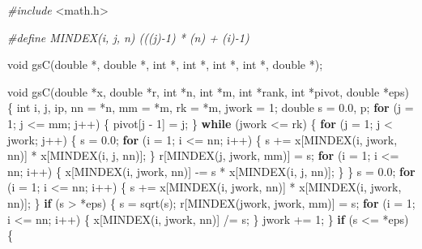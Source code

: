 \documentclass[
  12pt,
]{book}
\newenvironment{Shaded}{\begin{snugshade}}{\end{snugshade}}
\newcommand{\ControlFlowTok}[1]{\textcolor[rgb]{0.13,0.29,0.53}{\textbf{#1}}}
\newcommand{\DataTypeTok}[1]{\textcolor[rgb]{0.13,0.29,0.53}{#1}}
\newcommand{\DecValTok}[1]{\textcolor[rgb]{0.00,0.00,0.81}{#1}}
\newcommand{\FloatTok}[1]{\textcolor[rgb]{0.00,0.00,0.81}{#1}}
\newcommand{\ImportTok}[1]{#1}
\newcommand{\NormalTok}[1]{#1}
\newcommand{\PreprocessorTok}[1]{\textcolor[rgb]{0.56,0.35,0.01}{\textit{#1}}}
\begin{document}
\begin{Shaded}
\begin{Highlighting}[]
\PreprocessorTok{\#include }\ImportTok{\textless{}math.h\textgreater{}}

\PreprocessorTok{\#define MINDEX(i, j, n) (((j){-}1) * (n) + (i){-}1)}

\DataTypeTok{void}\NormalTok{ gsC(}\DataTypeTok{double}\NormalTok{ *, }\DataTypeTok{double}\NormalTok{ *, }\DataTypeTok{int}\NormalTok{ *, }\DataTypeTok{int}\NormalTok{ *, }\DataTypeTok{int}\NormalTok{ *, }\DataTypeTok{int}\NormalTok{ *, }\DataTypeTok{double}\NormalTok{ *);}

\DataTypeTok{void}\NormalTok{ gsC(}\DataTypeTok{double}\NormalTok{ *x, }\DataTypeTok{double}\NormalTok{ *r, }\DataTypeTok{int}\NormalTok{ *n, }\DataTypeTok{int}\NormalTok{ *m, }\DataTypeTok{int}\NormalTok{ *rank, }\DataTypeTok{int}\NormalTok{ *pivot,}
         \DataTypeTok{double}\NormalTok{ *eps) \{}
  \DataTypeTok{int}\NormalTok{ i, j, ip, nn = *n, mm = *m, rk = *m, jwork = }\DecValTok{1}\NormalTok{;}
  \DataTypeTok{double}\NormalTok{ s = }\FloatTok{0.0}\NormalTok{, p;}
  \ControlFlowTok{for}\NormalTok{ (j = }\DecValTok{1}\NormalTok{; j \textless{}= mm; j++) \{}
\NormalTok{    pivot[j {-} }\DecValTok{1}\NormalTok{] = j;}
\NormalTok{  \}}
  \ControlFlowTok{while}\NormalTok{ (jwork \textless{}= rk) \{}
    \ControlFlowTok{for}\NormalTok{ (j = }\DecValTok{1}\NormalTok{; j \textless{} jwork; j++) \{}
\NormalTok{      s = }\FloatTok{0.0}\NormalTok{;}
      \ControlFlowTok{for}\NormalTok{ (i = }\DecValTok{1}\NormalTok{; i \textless{}= nn; i++) \{}
\NormalTok{        s += x[MINDEX(i, jwork, nn)] * x[MINDEX(i, j, nn)];}
\NormalTok{      \}}
\NormalTok{      r[MINDEX(j, jwork, mm)] = s;}
      \ControlFlowTok{for}\NormalTok{ (i = }\DecValTok{1}\NormalTok{; i \textless{}= nn; i++) \{}
\NormalTok{        x[MINDEX(i, jwork, nn)] {-}= s * x[MINDEX(i, j, nn)];}
\NormalTok{      \}}
\NormalTok{    \}}
\NormalTok{    s = }\FloatTok{0.0}\NormalTok{;}
    \ControlFlowTok{for}\NormalTok{ (i = }\DecValTok{1}\NormalTok{; i \textless{}= nn; i++) \{}
\NormalTok{      s += x[MINDEX(i, jwork, nn)] * x[MINDEX(i, jwork, nn)];}
\NormalTok{    \}}
    \ControlFlowTok{if}\NormalTok{ (s \textgreater{} *eps) \{}
\NormalTok{      s = sqrt(s);}
\NormalTok{      r[MINDEX(jwork, jwork, mm)] = s;}
      \ControlFlowTok{for}\NormalTok{ (i = }\DecValTok{1}\NormalTok{; i \textless{}= nn; i++) \{}
\NormalTok{        x[MINDEX(i, jwork, nn)] /= s;}
\NormalTok{      \}}
\NormalTok{      jwork += }\DecValTok{1}\NormalTok{;}
\NormalTok{    \}}
    \ControlFlowTok{if}\NormalTok{ (s \textless{}= *eps) \{}

\end{Highlighting}
\end{Shaded}
\end{document}
